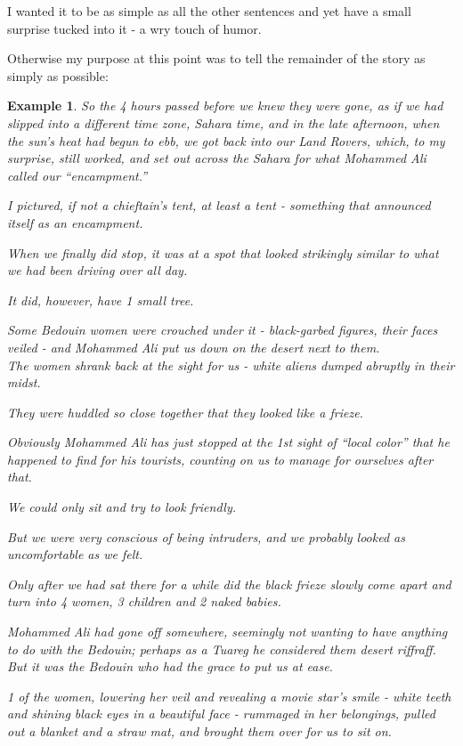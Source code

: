 \documentclass{book}
\numberwithin{equation}{section}
\newtheorem{example}{Example}[chapter]
\begin{document}
I wanted it to be as simple as all the other sentences and yet have a small surprise tucked into it - a wry touch of humor.

Otherwise my purpose at this point was to tell the remainder of the story as simply as possible:
\begin{example}
    So the 4 hours passed before we knew they were gone, as if we had slipped into a different time zone, Sahara time, and in the late afternoon, when the sun's heat had begun to ebb, we got back into our Land Rovers, which, to my surprise, still worked, and set out across the Sahara for what Mohammed Ali called our ``encampment.''

    I pictured, if not a chieftain's tent, at least a tent - something that announced itself as an encampment.
    
    When we finally did stop, it was at a spot that looked strikingly similar to what we had been driving over all day.
    
    It did, however, have 1 small tree.
    
    Some Bedouin women were crouched under it - black-garbed figures, their faces veiled - and Mohammed Ali put us down on the desert next to them.
    \\
    
    The women shrank back at the sight for us - white aliens dumped abruptly in their midst.
    
    They were huddled so close together that they looked like a frieze.
    
    Obviously Mohammed Ali has just stopped at the 1st sight of ``local color'' that he happened to find for his tourists, counting on us to manage for ourselves after that.
    
    We could only sit and try to look friendly.
    
    But we were very conscious of being intruders, and we probably looked as uncomfortable as we felt.
    
    Only after we had sat there for a while did the black frieze slowly come apart and turn into 4 women, 3 children and 2 naked babies.
    
    Mohammed Ali had gone off somewhere, seemingly not wanting to have anything to do with the Bedouin; perhaps as a Tuareg he considered them desert riffraff.
    \\
    
    But it was the Bedouin who had the grace to put us at ease.
    
    1 of the women, lowering her veil and revealing a movie star's smile - white teeth and shining black eyes in a beautiful face - rummaged in her belongings, pulled out a blanket and a straw mat, and brought them over for us to sit on.
    

\end{example}
\end{document}
